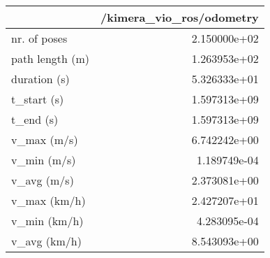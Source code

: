 \begin{tabular}{lr}
\toprule
{} &  /kimera\_vio\_ros/odometry \\
\midrule
nr. of poses    &              2.150000e+02 \\
path length (m) &              1.263953e+02 \\
duration (s)    &              5.326333e+01 \\
t\_start (s)     &              1.597313e+09 \\
t\_end (s)       &              1.597313e+09 \\
v\_max (m/s)     &              6.742242e+00 \\
v\_min (m/s)     &              1.189749e-04 \\
v\_avg (m/s)     &              2.373081e+00 \\
v\_max (km/h)    &              2.427207e+01 \\
v\_min (km/h)    &              4.283095e-04 \\
v\_avg (km/h)    &              8.543093e+00 \\
\bottomrule
\end{tabular}
